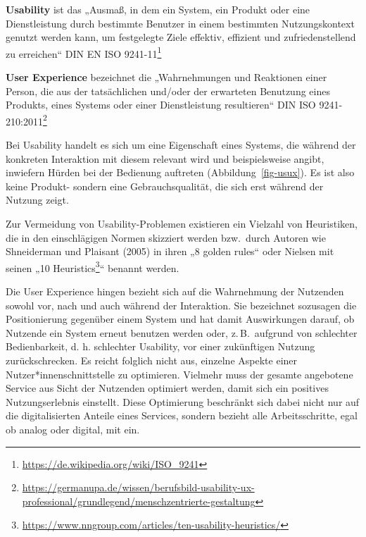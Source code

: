 \documentclass[
  11pt,
  letterpaper,
  DIV=11,
  twoside]{scrreprt}
\DeclareRobustCommand{\href}[2]{#2\footnote{\url{#1}}}
\begin{document}
\begin{tcolorbox}[enhanced jigsaw, leftrule=.75mm, toprule=.15mm, left=2mm, opacityback=0, arc=.35mm, colback=white, breakable, colframe=quarto-callout-tip-color-frame, rightrule=.15mm, bottomrule=.15mm]
\begin{minipage}[t]{5.5mm}
\textcolor{quarto-callout-tip-color}{\faLightbulb}
\end{minipage}%
\begin{minipage}[t]{\textwidth - 5.5mm}

\textbf{Usability} ist das „Ausmaß, in dem ein System, ein Produkt oder
eine Dienstleistung durch bestimmte Benutzer in einem bestimmten
Nutzungskontext genutzt werden kann, um festgelegte Ziele effektiv,
effizient und zufriedenstellend zu erreichen``
\href{https://de.wikipedia.org/wiki/ISO_9241}{DIN EN ISO 9241-11}

\textbf{User Experience} bezeichnet die „Wahrnehmungen und Reaktionen
einer Person, die aus der tatsächlichen und/oder der erwarteten
Benutzung eines Produkts, eines Systems oder einer Dienstleistung
resultieren``
\href{https://germanupa.de/wissen/berufsbild-usability-ux-professional/grundlegend/menschzentrierte-gestaltung}{DIN
ISO 9241-210:2011}

\end{minipage}%
\end{tcolorbox}

Bei Usability handelt es sich um eine Eigenschaft eines Systems, die
während der konkreten Interaktion mit diesem relevant wird und
beispielsweise angibt, inwiefern Hürden bei der Bedienung auftreten
(Abbildung~\ref{fig-usux}). Es ist also keine Produkt- sondern eine
Gebrauchsqualität, die sich erst während der Nutzung zeigt.

Zur Vermeidung von Usability-Problemen existieren ein Vielzahl von
Heuristiken, die in den einschlägigen Normen skizziert werden bzw.~durch
Autoren wie Shneiderman und Plaisant (2005) in ihren „8 golden rules``
oder Nielsen mit seinen
„\href{https://www.nngroup.com/articles/ten-usability-heuristics/}{10
Heuristics}`` benannt werden.

Die User Experience hingen bezieht sich auf die Wahrnehmung der
Nutzenden sowohl vor, nach und auch während der Interaktion. Sie
bezeichnet sozusagen die Positionierung gegenüber einem System und hat
damit Auswirkungen darauf, ob Nutzende ein System erneut benutzen werden
oder, z.\,B.~aufgrund von schlechter Bedienbarkeit, d. h. schlechter
Usability, vor einer zukünftigen Nutzung zurückschrecken. Es reicht
folglich nicht aus, einzelne Aspekte einer Nutzer*innenschnittstelle zu
optimieren. Vielmehr muss der gesamte angebotene Service aus Sicht der
Nutzenden optimiert werden, damit sich ein positives Nutzungserlebnis
einstellt. Diese Optimierung beschränkt sich dabei nicht nur auf die
digitalisierten Anteile eines Services, sondern bezieht alle
Arbeitsschritte, egal ob analog oder digital, mit ein.
\end{document}
